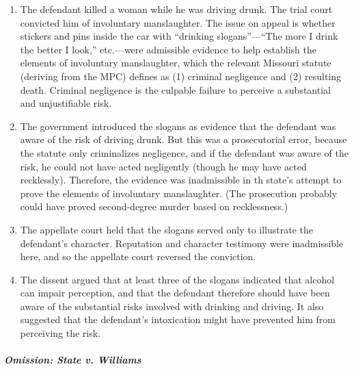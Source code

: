 \begin{enumerate}
    \item The defendant killed a woman while he was driving drunk. The trial court convicted him of involuntary manslaughter. The issue on appeal is whether stickers and pins inside the car with ``drinking slogans''---``The more I drink the better I look,'' etc.---were admissible evidence to help establish the elements of involuntary manslaughter, which the relevant Missouri statute (deriving from the MPC) defines as (1) criminal negligence and (2) resulting death. Criminal negligence is the culpable failure to perceive a substantial and unjustifiable risk.
    \item The government introduced the slogans as evidence that the defendant was aware of the risk of driving drunk. But this was a prosecutorial error, because the statute only criminalizes negligence, and if the defendant was aware of the risk, he could not have acted negligently (though he may have acted recklessly). Therefore, the evidence was inadmissible in th state's attempt to prove the elements of involuntary manslaughter. (The prosecution probably could have proved second-degree murder based on recklessness.)
    \item The appellate court held that the slogans served only to illustrate the defendant's character. Reputation and character testimony were inadmissible here, and so the appellate court reversed the conviction.
    \item The dissent argued that at least three of the slogans indicated that alcohol can impair perception, and that the defendant therefore should have been aware of the substantial risks involved with drinking and driving. It also suggested that the defendant's intoxication might have prevented him from perceiving the risk.
\end{enumerate}

\paragraph{\emph{Omission: State v. Williams}}

